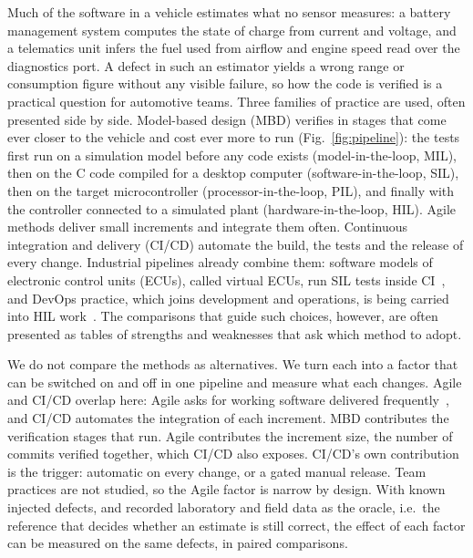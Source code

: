 \documentclass[conference]{IEEEtran}
\begin{document}
Much of the software in a vehicle estimates what no sensor measures: a battery management system computes
the state of charge from current and voltage, and a telematics unit infers the fuel used from airflow and
engine speed read over the diagnostics port. A defect in such an estimator yields a wrong range or consumption figure without any visible
failure, so how the code is verified is a practical question for automotive teams. Three families of practice
are used, often presented side by side. Model-based design (MBD) verifies in stages that come ever closer to
the vehicle and cost ever more to run (Fig.~\ref{fig:pipeline}): the tests first run on a simulation model
before any code exists (model-in-the-loop, MIL), then on the C code compiled for a desktop computer
(software-in-the-loop, SIL), then on the target microcontroller (processor-in-the-loop, PIL), and finally with
the controller connected to a simulated plant (hardware-in-the-loop, HIL). Agile methods deliver small
increments and integrate them often. Continuous integration and delivery (CI/CD) automate the build, the tests
and the release of every change. Industrial pipelines already combine them: software models of electronic
control units (ECUs), called virtual ECUs, run SIL tests inside CI~\cite{kavgic2026,kim2026}, and DevOps practice, which
joins development and operations, is being carried into HIL work~\cite{schlatzer2025}. The comparisons that
guide such choices, however, are often presented as tables of strengths and weaknesses that ask which method
to adopt.

We do not compare the methods as alternatives. We turn each into a factor that can be switched on and off in
one pipeline and measure what each changes. Agile and CI/CD overlap here: Agile asks for working software delivered
frequently~\cite{agilemanifesto}, and CI/CD automates the integration of each
increment. MBD contributes the verification stages that run. Agile contributes the increment size, the
number of commits verified together, which CI/CD also exposes. CI/CD's own contribution is the trigger:
automatic on every change, or a gated manual release. Team practices are not studied, so the Agile factor is
narrow by design. With known injected defects, and recorded laboratory and field data as the oracle, i.e.\ the reference that decides whether an estimate is still correct, the effect of each
factor can be measured on the same defects, in paired comparisons.
\end{document}
